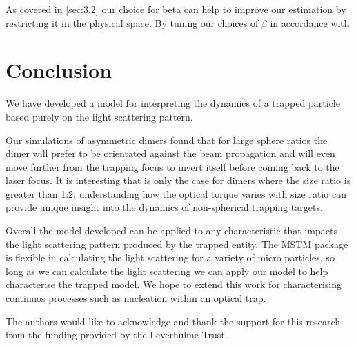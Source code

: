 \documentclass[preprint,3p]{elsarticle}
\begin{document}
As covered in \ref{sec:3.2} our choice for beta can help to improve our estimation by restricting it in the physical space. By tuning our choices of $\beta$ in accordance with

\section{Conclusion}
\label{4}
We have developed a model for interpreting the dynamics of a trapped particle based purely on the light scattering pattern.

Our simulations of asymmetric dimers found that for large sphere ratios the dimer will prefer to be orientated against the beam propagation and will even move further from the trapping focus to invert itself before coming back to the laser focus. It is interesting that is only the case for dimers where the size ratio is greater than 1:2, understanding how the optical torque varies with size ratio can provide unique insight into the dynamics of non-spherical trapping targets.  

Overall the model developed can be applied to any characteristic that impacts the light scattering pattern produced by the trapped entity. The MSTM package is flexible in  calculating the light scattering for a variety of micro particles, so long as we can calculate the light scattering we can apply our model to help characterise the trapped model. We hope to extend this work for characterising continuos processes such as nucleation within an optical trap.  

The authors would like to acknowledge and thank the support for this research from the funding provided by the Leverhulme Trust.  

 

\newpage
\end{document}
